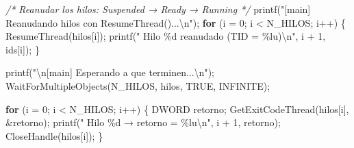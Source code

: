 \documentclass[
  spanish,
]{article}
\newenvironment{Shaded}{}{}
\newcommand{\CommentTok}[1]{\textcolor[rgb]{0.38,0.63,0.69}{\textit{#1}}}
\newcommand{\ControlFlowTok}[1]{\textcolor[rgb]{0.00,0.44,0.13}{\textbf{#1}}}
\newcommand{\DecValTok}[1]{\textcolor[rgb]{0.25,0.63,0.44}{#1}}
\newcommand{\NormalTok}[1]{#1}
\newcommand{\OperatorTok}[1]{\textcolor[rgb]{0.40,0.40,0.40}{#1}}
\newcommand{\SpecialCharTok}[1]{\textcolor[rgb]{0.25,0.44,0.63}{#1}}
\newcommand{\StringTok}[1]{\textcolor[rgb]{0.25,0.44,0.63}{#1}}
\begin{document}
\begin{Shaded}
\begin{Highlighting}[]
    \CommentTok{/* Reanudar los hilos: Suspended → Ready → Running */}
\NormalTok{    printf}\OperatorTok{(}\StringTok{"[main] Reanudando hilos con ResumeThread()...}\SpecialCharTok{\textbackslash{}n}\StringTok{"}\OperatorTok{);}
    \ControlFlowTok{for} \OperatorTok{(}\NormalTok{i }\OperatorTok{=} \DecValTok{0}\OperatorTok{;}\NormalTok{ i }\OperatorTok{\textless{}}\NormalTok{ N\_HILOS}\OperatorTok{;}\NormalTok{ i}\OperatorTok{++)} \OperatorTok{\{}
\NormalTok{        ResumeThread}\OperatorTok{(}\NormalTok{hilos}\OperatorTok{[}\NormalTok{i}\OperatorTok{]);}
\NormalTok{        printf}\OperatorTok{(}\StringTok{"  Hilo }\SpecialCharTok{\%d}\StringTok{ reanudado (TID = }\SpecialCharTok{\%lu}\StringTok{)}\SpecialCharTok{\textbackslash{}n}\StringTok{"}\OperatorTok{,}\NormalTok{ i }\OperatorTok{+} \DecValTok{1}\OperatorTok{,}\NormalTok{ ids}\OperatorTok{[}\NormalTok{i}\OperatorTok{]);}
    \OperatorTok{\}}

\NormalTok{    printf}\OperatorTok{(}\StringTok{"}\SpecialCharTok{\textbackslash{}n}\StringTok{[main] Esperando a que terminen...}\SpecialCharTok{\textbackslash{}n}\StringTok{"}\OperatorTok{);}
\NormalTok{    WaitForMultipleObjects}\OperatorTok{(}\NormalTok{N\_HILOS}\OperatorTok{,}\NormalTok{ hilos}\OperatorTok{,}\NormalTok{ TRUE}\OperatorTok{,}\NormalTok{ INFINITE}\OperatorTok{);}

    \ControlFlowTok{for} \OperatorTok{(}\NormalTok{i }\OperatorTok{=} \DecValTok{0}\OperatorTok{;}\NormalTok{ i }\OperatorTok{\textless{}}\NormalTok{ N\_HILOS}\OperatorTok{;}\NormalTok{ i}\OperatorTok{++)} \OperatorTok{\{}
\NormalTok{        DWORD retorno}\OperatorTok{;}
\NormalTok{        GetExitCodeThread}\OperatorTok{(}\NormalTok{hilos}\OperatorTok{[}\NormalTok{i}\OperatorTok{],} \OperatorTok{\&}\NormalTok{retorno}\OperatorTok{);}
\NormalTok{        printf}\OperatorTok{(}\StringTok{"  Hilo }\SpecialCharTok{\%d}\StringTok{ → retorno = }\SpecialCharTok{\%lu\textbackslash{}n}\StringTok{"}\OperatorTok{,}\NormalTok{ i }\OperatorTok{+} \DecValTok{1}\OperatorTok{,}\NormalTok{ retorno}\OperatorTok{);}
\NormalTok{        CloseHandle}\OperatorTok{(}\NormalTok{hilos}\OperatorTok{[}\NormalTok{i}\OperatorTok{]);}
    \OperatorTok{\}}


\end{Highlighting}
\end{Shaded}
\end{document}
